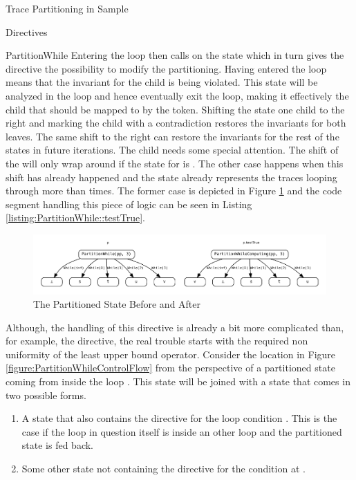 \begin{chapter}{Trace Partitioning in Sample}
\begin{section}{Directives}
\begin{subsection}{PartitionWhile}
			Entering the loop then calls  on the state which in turn gives the directive the possibility to modify the partitioning. Having entered the loop means that the invariant for the  child is being violated. This state will be analyzed in the loop and hence eventually exit the loop, making it effectively the child that should be mapped to by the  token. Shifting the state one child to the right and marking the  child with a contradiction restores the invariants for both leaves. The same shift to the right can restore the invariants for the rest of the  states in future iterations. The  child needs some special attention. The shift of the  will only wrap around if the state for  is . The other case happens when this shift has already happened and the state already represents the traces looping through more than  times. The former case is depicted in Figure \ref{figure:PartitionWhile::testTrue} and the code segment handling this piece of logic can be seen in Listing \ref{listing:PartitionWhile::testTrue}.

			

			\begin{figure}
				\centering
				\includegraphics[width=\textwidth]{Graphs/PartitionWhile_testTrue.pdf}
				\caption{The Partitioned State Before and After }
				\label{figure:PartitionWhile::testTrue}
			\end{figure}

			Although, the handling of this directive is already a bit more complicated than, for example, the  directive, the real trouble starts with the required non uniformity of the least upper bound operator. Consider the location \three in Figure \ref{figure:PartitionWhileControlFlow} from the perspective of a partitioned state coming from inside the loop \two. This state will be joined with a state that comes in two possible forms.

			\begin{enumerate}
				\item A state that also contains the  directive for the loop condition \one. This is the case if the loop in question itself is inside an other loop and the partitioned state is fed back.
				\item Some other state not containing the  directive for the condition at \one.
			\end{enumerate}


\end{subsection}
\end{section}
\end{chapter}
